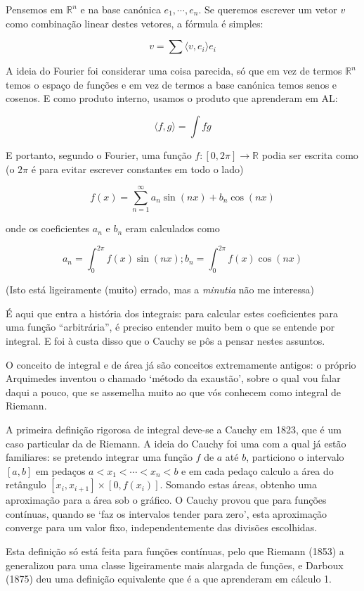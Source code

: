 \documentclass{article}
\newcommand{\R}{\mathbb{R}}
\begin{document}
Pensemos em $\R^n$ e na base canónica $e_1, \cdots, e_n$. Se queremos escrever um vetor $v$ como combinação linear destes vetores, a fórmula é simples:

\[v = \sum \langle v, e_i \rangle e_i\]

A ideia do Fourier foi considerar uma coisa parecida, só que em vez de termos $\R^n$ temos o espaço de funções e em vez de termos a base canónica temos senos e cosenos. E como produto interno, usamos o produto que aprenderam em AL:

\[ \langle f, g \rangle = \int fg \]

E portanto, segundo o Fourier, uma função $f : [0, 2 \pi] \to \R$ podia ser escrita como (o $2 \pi$ é para evitar escrever constantes em todo o lado)

\[f(x) = \sum_{n = 1}^\infty a_n \sin( n x ) + b_n \cos ( n x )\]

onde os coeficientes $a_n$ e $b_n$ eram calculados como

\[a_n = \int_0^{2 \pi} f(x) \sin ( n x ); b_n = \int_0^{2 \pi} f(x) \cos ( n x )\]

(Isto está ligeiramente (muito) errado, mas a \emph{minutia} não me interessa)

É aqui que entra a história dos integrais: para calcular estes coeficientes para uma função ``arbitrária'', é preciso entender muito bem o que se entende por integral. E foi à custa disso que o Cauchy se pôs a pensar nestes assuntos.

O conceito de integral e de área já são conceitos extremamente antigos: o próprio Arquimedes inventou o chamado `método da exaustão', sobre o qual vou falar daqui a pouco, que se assemelha muito ao que vós conhecem como integral de Riemann.

A primeira definição rigorosa de integral deve-se a Cauchy em 1823, que é um caso particular da de Riemann. A ideia do Cauchy foi uma com a qual já estão familiares: se pretendo integrar uma função $f$ de $a$ até $b$, particiono o intervalo $[a,b]$ em pedaços $a < x_1 < \cdots < x_n < b$ e em cada pedaço calculo a área do retângulo $[x_i, x_{i+1}] \times [0, f(x_i)]$. Somando estas áreas, obtenho uma aproximação para a área sob o gráfico. O Cauchy provou que para funções contínuas, quando se `faz os intervalos tender para zero', esta aproximação converge para um valor fixo, independentemente das divisões escolhidas.

Esta definição só está feita para funções contínuas, pelo que Riemann (1853) a generalizou para uma classe ligeiramente mais alargada de funções, e Darboux (1875) deu uma definição equivalente que é a que aprenderam em cálculo 1.
\end{document}
